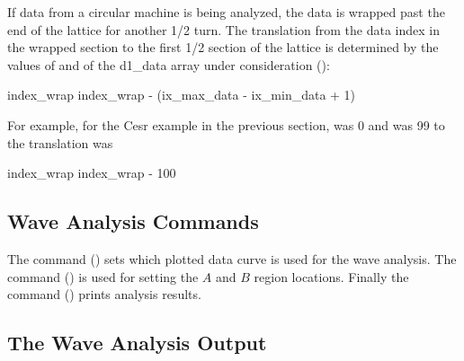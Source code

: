 If data from a circular machine is being analyzed, the data is wrapped
past the end of the lattice for another 1/2 turn. The translation from
the data index in the wrapped section to the first 1/2 section of the
lattice is determined by the values of  and
 of the d1_data array under consideration
():
\begin{example}
  index_wrap \longrightarrow index_wrap - (ix_max_data - ix_min_data + 1)
\end{example}
For example, for the Cesr example in the previous section,
 was 0 and  was 99 to the translation
was
\begin{example}
  index_wrap \longringtarrow index_wrap - 100
\end{example}

\subsection{Wave Analysis Commands}
\label{ss:wave.cmd}

The  command () sets which plotted data curve
is used for the wave analysis. The  command () 
is used for setting the $A$ and $B$ region locations. Finally the 
 command () prints analysis results. 

\subsection{The Wave Analysis Output}
\label{ss:wave.cmd}

